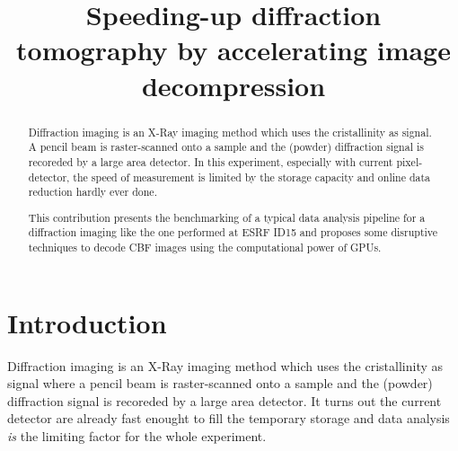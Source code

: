 \documentclass[preprint, pdf]{iucr}              %
\begin{document}

\title{Speeding-up diffraction tomography by accelerating image decompression}

 





\maketitle                        %

\begin{synopsis}
\end{synopsis}

\begin{abstract}

Diffraction imaging is an X-Ray imaging method which uses the cristallinity
as signal. 
A pencil beam is raster-scanned onto a sample and the (powder) diffraction
signal is recoreded by a large area detector.
In this experiment, especially with current pixel-detector, the speed of
measurement is limited by the storage capacity and online data reduction
hardly ever done. 

This contribution presents the benchmarking of a typical data
analysis pipeline for a diffraction imaging like the one performed at ESRF ID15
and proposes some disruptive techniques to decode CBF images using the
computational power of GPUs. 

\end{abstract}


\section{Introduction}

Diffraction imaging is an X-Ray imaging method which uses the cristallinity
as signal where a pencil beam is raster-scanned onto a sample and the
(powder) diffraction signal is recoreded by a large area detector.
It turns out the current detector are already
fast enought to fill the temporary storage and data analysis \emph{is} the
limiting factor for the whole experiment. 
\end{document}
